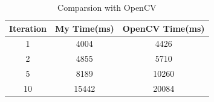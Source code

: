 \documentclass{article}
\begin{document}
    \begin{table}[!hbp]
        \begin{tabular}{|c|c|c|}
        \hline
        \hline
        Iteration & My Time(ms) & OpenCV Time(ms) \\
        \hline
        1 & 4004 & 4426 \\
        \hline
        2 &4855 & 5710 \\
        \hline
        5 & 8189 & 10260 \\
        \hline
        10 & 15442 & 20084 \\
        \hline
        \end{tabular}
        \caption{Comparsion with OpenCV}
    \end{table}

\renewcommand\refname{Reference}


\end{document}
